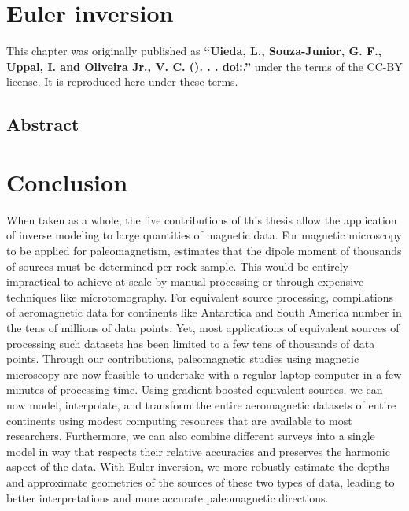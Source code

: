 \documentclass[10pt,a4paper,oneside]{book}
\begin{document}

\endgroup

\chapter{Euler inversion}
\label{chap_euler}

\begingroup



\begin{summarybox}
    \noindent
    This chapter was originally published as
    \textbf{``Uieda, L., Souza-Junior, G. F., Uppal, I. and Oliveira Jr., V. C.
    (\Year). \Title{}. \textit{\Journal{}}.
    doi:\href{https://doi.org/\JournalDOI}{\JournalDOI}.''} under the
    terms of the CC-BY license. It is reproduced here under these terms.
\end{summarybox}

\section*{Abstract}



\endgroup

\chapter{Conclusion}

When taken as a whole, the five contributions of this thesis allow the
application of inverse modeling to large quantities of magnetic data.
For magnetic microscopy to be applied for paleomagnetism, \citet{Bellon2025}
estimates that the dipole moment of thousands of sources must be determined per
rock sample.
This would be entirely impractical to achieve at scale by manual processing or
through expensive techniques like microtomography.
For equivalent source processing, compilations of aeromagnetic data for
continents like Antarctica and South America number in the tens of millions of
data points.
Yet, most applications of equivalent sources of processing such datasets has
been limited to a few tens of thousands of data points.
Through our contributions, paleomagnetic studies using magnetic microscopy are
now feasible to undertake with a regular laptop computer in a few minutes of
processing time.
Using gradient-boosted equivalent sources, we can now model, interpolate, and
transform the entire aeromagnetic datasets of entire continents using modest
computing resources that are available to most researchers.
Furthermore, we can also combine different surveys into a single model in way
that respects their relative accuracies and preserves the harmonic aspect of
the data.
With Euler inversion, we more robustly estimate the depths and approximate
geometries of the sources of these two types of data, leading to better
interpretations and more accurate paleomagnetic directions.
\end{document}
